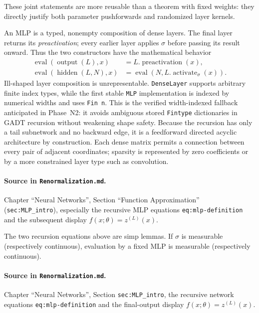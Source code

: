 These joint statements are more reusable than a theorem with fixed weights: they directly justify
both parameter pushforwards and randomized layer kernels.

\begin{definition}
\label{def:renorm:mlp}
An MLP is a typed, nonempty composition of dense layers.  The final layer returns its
\emph{preactivation}; every earlier layer applies $\sigma$ before passing its result onward.  Thus
the two constructors have the mathematical behavior
\begin{align*}
 \operatorname{eval}(\operatorname{output}(L),x)&=L.\operatorname{preactivation}(x),\\
 \operatorname{eval}(\operatorname{hidden}(L,N),x)
   &=\operatorname{eval}(N,L.\operatorname{activate}_\sigma(x)).
\end{align*}
Ill-shaped layer composition is unrepresentable.  \texttt{DenseLayer} supports arbitrary finite
index types, while the first stable \texttt{MLP} implementation is indexed by numerical widths and
uses \texttt{Fin n}.  This is the verified width-indexed fallback anticipated in Phase~N2: it avoids
ambiguous stored \texttt{Fintype} dictionaries in GADT recursion without weakening shape safety.
Because the recursion has only a tail subnetwork and no backward edge, it is a feedforward directed
acyclic architecture by construction.  Each dense matrix permits a connection between every pair
of adjacent coordinates; sparsity is represented by zero coefficients or by a more constrained
layer type such as convolution.

\paragraph{Source in \texttt{Renormalization.md}.}
Chapter ``Neural Networks'', Section ``Function Approximation'' (\texttt{sec:MLP\_intro}), especially
the recursive MLP equations \texttt{eq:mlp-definition} and the subsequent display
$f(x;\theta)=z^{(L)}(x)$.
\end{definition}

\begin{lemma}
\label{lem:renorm:mlpEval}
The two recursion equations above are simp lemmas.  If $\sigma$ is measurable (respectively
continuous), evaluation by a fixed MLP is measurable (respectively continuous).

\paragraph{Source in \texttt{Renormalization.md}.}
Chapter ``Neural Networks'', Section \texttt{sec:MLP\_intro}, the recursive network equations
\texttt{eq:mlp-definition} and the final-output display $f(x;\theta)=z^{(L)}(x)$.
\end{lemma}

